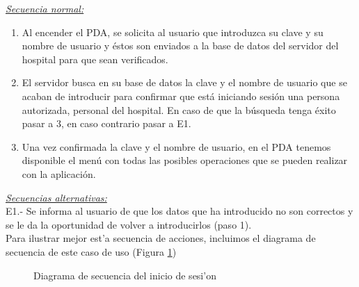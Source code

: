 \emph{\underline{Secuencia normal:}}
\begin{enumerate}
	\item Al encender el PDA, se solicita al usuario que introduzca su clave y su nombre de usuario y \'estos son enviados a la base de datos del servidor del hospital para que sean verificados.
	\item El servidor busca en su base de datos la clave y el nombre de usuario que se acaban de introducir para confirmar que est\'a iniciando sesi\'on una persona autorizada, personal del hospital. En caso de que la b\'usqueda tenga \'exito pasar a 3, en caso contrario pasar a E1.
	\item Una vez confirmada la clave y el nombre de usuario, en el PDA tenemos disponible el men\'u con todas las posibles operaciones que se pueden realizar con la aplicaci\'on.
\end{enumerate}

\emph{\underline{Secuencias alternativas:}}\bigskip \\ E1.- Se informa al usuario de que los datos que ha introducido no son correctos y se le da la oportunidad de volver a introducirlos (paso 1). \bigskip \\ Para ilustrar mejor est'a secuencia de acciones, incluimos el diagrama de secuencia de este caso de uso (Figura \ref{fig:inicio_sesion})

\begin{figure}[thb]
	\begin{center}
     	\end{center}
    	\caption{Diagrama de secuencia del inicio de sesi'on}\label{fig:inicio_sesion}
\end{figure}